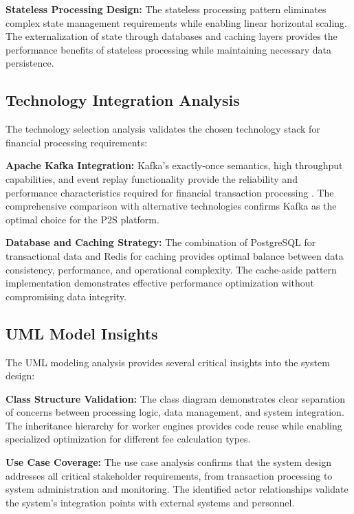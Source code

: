 \textbf{Stateless Processing Design:}
The stateless processing pattern eliminates complex state management requirements while enabling linear horizontal scaling. The externalization of state through databases and caching layers provides the performance benefits of stateless processing while maintaining necessary data persistence.

\subsection{Technology Integration Analysis}

The technology selection analysis validates the chosen technology stack for financial processing requirements:

\textbf{Apache Kafka Integration:}
Kafka's exactly-once semantics, high throughput capabilities, and event replay functionality provide the reliability and performance characteristics required for financial transaction processing \cite{narkhede2017kafka}. The comprehensive comparison with alternative technologies confirms Kafka as the optimal choice for the P2S platform.

\textbf{Database and Caching Strategy:}
The combination of PostgreSQL for transactional data and Redis for caching provides optimal balance between data consistency, performance, and operational complexity. The cache-aside pattern implementation demonstrates effective performance optimization without compromising data integrity.

\subsection{UML Model Insights}

The UML modeling analysis provides several critical insights into the system design:

\textbf{Class Structure Validation:}
The class diagram demonstrates clear separation of concerns between processing logic, data management, and system integration. The inheritance hierarchy for worker engines provides code reuse while enabling specialized optimization for different fee calculation types.

\textbf{Use Case Coverage:}
The use case analysis confirms that the system design addresses all critical stakeholder requirements, from transaction processing to system administration and monitoring. The identified actor relationships validate the system's integration points with external systems and personnel.

